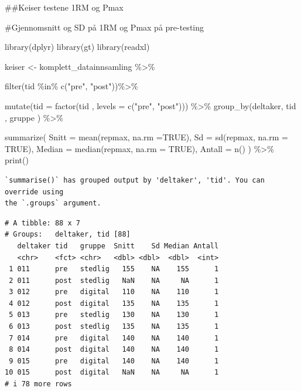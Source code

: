 \documentclass[
  letterpaper,
  DIV=11,
  numbers=noendperiod]{scrreprt}
\newenvironment{Shaded}{\begin{snugshade}}{\end{snugshade}}
\newcommand{\AttributeTok}[1]{\textcolor[rgb]{0.40,0.45,0.13}{#1}}
\newcommand{\CommentTok}[1]{\textcolor[rgb]{0.37,0.37,0.37}{#1}}
\newcommand{\ConstantTok}[1]{\textcolor[rgb]{0.56,0.35,0.01}{#1}}
\newcommand{\FunctionTok}[1]{\textcolor[rgb]{0.28,0.35,0.67}{#1}}
\newcommand{\NormalTok}[1]{\textcolor[rgb]{0.00,0.23,0.31}{#1}}
\newcommand{\OtherTok}[1]{\textcolor[rgb]{0.00,0.23,0.31}{#1}}
\newcommand{\SpecialCharTok}[1]{\textcolor[rgb]{0.37,0.37,0.37}{#1}}
\newcommand{\StringTok}[1]{\textcolor[rgb]{0.13,0.47,0.30}{#1}}
\begin{document}
\#\#Keiser testene 1RM og Pmax

\begin{Shaded}
\begin{Highlighting}[]
\CommentTok{\#Gjennomsnitt og SD på 1RM og Pmax på pre{-}testing}

 
\FunctionTok{library}\NormalTok{(dplyr)}
\FunctionTok{library}\NormalTok{(gt)}
\FunctionTok{library}\NormalTok{(readxl)}

\NormalTok{keiser }\OtherTok{\textless{}{-}}\NormalTok{ komplett\_datainnsamling }\SpecialCharTok{\%\textgreater{}\%}

  \FunctionTok{filter}\NormalTok{(tid }\SpecialCharTok{\%in\%} \FunctionTok{c}\NormalTok{(}\StringTok{"pre"}\NormalTok{, }\StringTok{"post"}\NormalTok{))}\SpecialCharTok{\%\textgreater{}\%}
  
  \FunctionTok{mutate}\NormalTok{(}\AttributeTok{tid =} \FunctionTok{factor}\NormalTok{(tid , }\AttributeTok{levels =} \FunctionTok{c}\NormalTok{(}\StringTok{"pre"}\NormalTok{, }\StringTok{"post"}\NormalTok{))) }\SpecialCharTok{\%\textgreater{}\%}
  \FunctionTok{group\_by}\NormalTok{(deltaker, tid , gruppe ) }\SpecialCharTok{\%\textgreater{}\%}
 
 
   \FunctionTok{summarize}\NormalTok{(}
    \AttributeTok{Snitt =} \FunctionTok{mean}\NormalTok{(repmax, }\AttributeTok{na.rm =}\ConstantTok{TRUE}\NormalTok{),}
    \AttributeTok{Sd =} \FunctionTok{sd}\NormalTok{(repmax, }\AttributeTok{na.rm =} \ConstantTok{TRUE}\NormalTok{),}
    \AttributeTok{Median =} \FunctionTok{median}\NormalTok{(repmax, }\AttributeTok{na.rm =} \ConstantTok{TRUE}\NormalTok{),}
    \AttributeTok{Antall =} \FunctionTok{n}\NormalTok{()}
\NormalTok{  ) }\SpecialCharTok{\%\textgreater{}\%}
  \FunctionTok{print}\NormalTok{()}
\end{Highlighting}
\end{Shaded}

\begin{verbatim}
`summarise()` has grouped output by 'deltaker', 'tid'. You can override using
the `.groups` argument.
\end{verbatim}

\begin{verbatim}
# A tibble: 88 x 7
# Groups:   deltaker, tid [88]
   deltaker tid   gruppe  Snitt    Sd Median Antall
   <chr>    <fct> <chr>   <dbl> <dbl>  <dbl>  <int>
 1 011      pre   stedlig   155    NA    155      1
 2 011      post  stedlig   NaN    NA     NA      1
 3 012      pre   digital   110    NA    110      1
 4 012      post  digital   135    NA    135      1
 5 013      pre   stedlig   130    NA    130      1
 6 013      post  stedlig   135    NA    135      1
 7 014      pre   digital   140    NA    140      1
 8 014      post  digital   140    NA    140      1
 9 015      pre   digital   140    NA    140      1
10 015      post  digital   NaN    NA     NA      1
# i 78 more rows
\end{verbatim}
\end{document}
